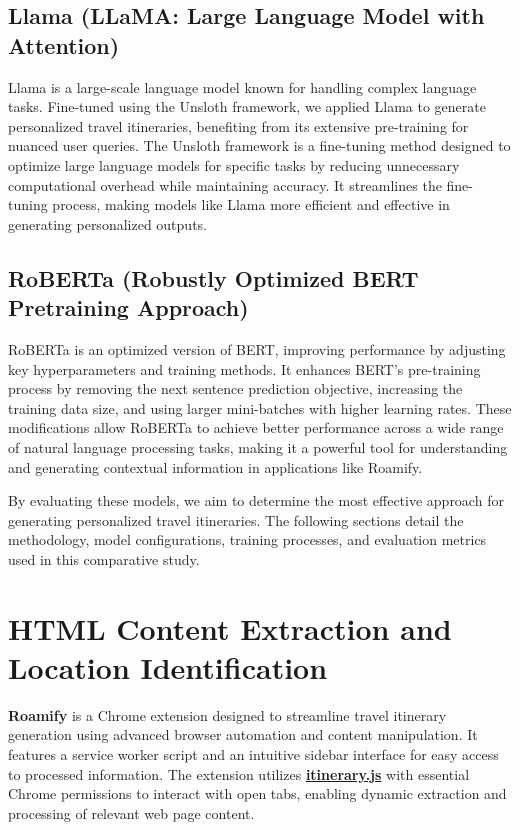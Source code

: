 \documentclass[conference]{IEEEtran}
\begin{document}
\subsection{Llama (LLaMA: Large Language Model with Attention)}
Llama is a large-scale language model known for handling complex language tasks. Fine-tuned using the Unsloth framework, we applied Llama to generate personalized travel itineraries, benefiting from its extensive pre-training for nuanced user queries.
The Unsloth framework is a fine-tuning method designed to optimize large language models for specific tasks by reducing unnecessary computational overhead while maintaining accuracy. It streamlines the fine-tuning process, making models like Llama more efficient and effective in generating personalized outputs.


\subsection{RoBERTa (Robustly Optimized BERT Pretraining Approach)}
RoBERTa is an optimized version of BERT, improving performance by adjusting key hyperparameters and training methods. It enhances BERT's pre-training process by removing the next sentence prediction objective, increasing the training data size, and using larger mini-batches with higher learning rates. These modifications allow RoBERTa to achieve better performance across a wide range of natural language processing tasks, making it a powerful tool for understanding and generating contextual information in applications like Roamify.



    By evaluating these models, we aim to determine the most effective approach for generating personalized travel itineraries. The following sections detail the methodology, model configurations, training processes, and evaluation metrics used in this comparative study.


\section{HTML Content Extraction and Location Identification}

    \textbf{Roamify} is a Chrome extension designed to streamline travel itinerary generation using advanced browser automation and content manipulation. It features a service worker script and an intuitive sidebar interface for easy access to processed information. The extension utilizes \href{https://github.com/Roamify-Research/Extension/blob/main/src/scripts/itinerary.js}{\textbf{itinerary.js}} with essential Chrome permissions to interact with open tabs, enabling dynamic extraction and processing of relevant web page content.
\end{document}
